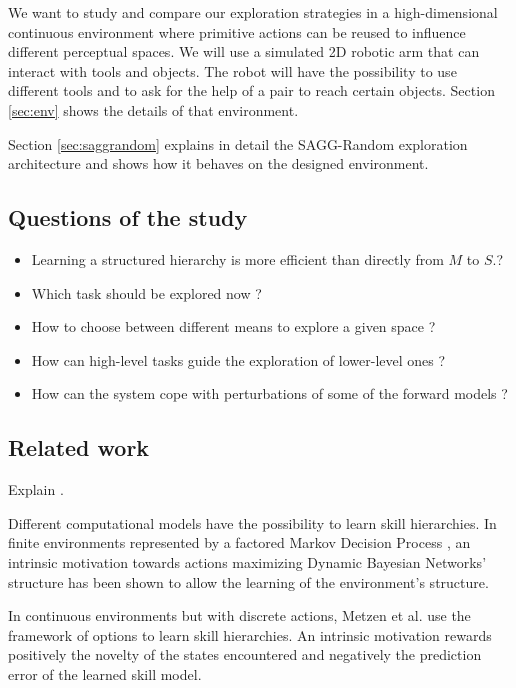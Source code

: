 \documentclass[conference]{include/IEEEtran}
\begin{document}
	We want to study and compare our exploration strategies in a high-dimensional continuous environment where primitive actions can be reused to influence different perceptual spaces.
	We will use a simulated 2D robotic arm that can interact with tools and objects. 
	The robot will have the possibility to use different tools and to ask for the help of a pair to reach certain objects.	
	Section \ref{sec:env} shows the details of that environment.
	
	Section \ref{sec:saggrandom} explains in detail the SAGG-Random exploration architecture and shows how it behaves on the designed environment.

	\subsection{Questions of the study}
			
		\begin{itemize}
			\item Learning a structured hierarchy is more efficient than directly from $M$ to $S$.?
			\item Which task should be explored now ?
			\item How to choose between different means to explore a given space ? 
			\item How can high-level tasks guide the exploration of lower-level ones ?
			\item How can the system cope with perturbations of some of the forward models ?		
		\end{itemize}

	
	\subsection{Related work}
		Explain \cite{ugur2014, ugur2015, schmerlinggoal}.

		Different computational models have the possibility to learn skill hierarchies. 
		In finite environments represented by a factored Markov Decision Process \cite{vig}, an intrinsic motivation towards actions 
		maximizing Dynamic Bayesian Networks' structure has been shown to allow the learning of the environment's structure.
		
		In continuous environments but with discrete actions, Metzen et al. \cite{metzen2013} use the framework of options \cite{sutton1999between} 
		to learn skill hierarchies. 
		An intrinsic motivation rewards positively the novelty of the states encountered and negatively the prediction error of the learned skill model.
		
\end{document}
